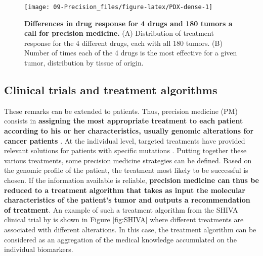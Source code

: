 \documentclass[a4paper,12pt,twoside,onecolumn,openright,final,oldfontcommands]{memoir}
\begin{document}
\begin{figure}

{\centering \texttt{[image: 09-Precision\_files/figure-latex/PDX-dense-1]} 

}

\caption[Differences in drug response for 4 drugs and 180 tumors a call for precision medicine]{\textbf{Differences in drug response for 4 drugs
and 180 tumors a call for precision medicine.} (A) Distribution of
treatment response for the 4 different drugs, each with all 180 tumors.
(B) Number of times each of the 4 drugs is the most effective for a
given tumor, distribution by tissue of origin.}\label{fig:PDX-dense}
\end{figure}







\subsection{Clinical trials and treatment
algorithms}\label{clinical-trials-and-treatment-algorithms}

These remarks can be extended to patients. Thus, precision medicine (PM)
consists in \textbf{assigning the most appropriate treatment to each
patient according to his or her characteristics, usually genomic
alterations for cancer patients}
\citep{friedman2015precision, de2015pragmatic}. At the individual level,
targeted treatments have provided relevant solutions for patients with
specific mutations \citep{abou2003overview}. Putting together these
various treatments, some precision medicine strategies can be defined.
Based on the genomic profile of the patient, the treatment most likely
to be successful is chosen. If the information available is reliable,
\textbf{precision medicine can thus be reduced to a treatment algorithm
that takes as input the molecular characteristics of the patient's tumor
and outputs a recommendation of treatment}. An example of such a
treatment algorithm from the SHIVA clinical trial by
\citet{le2015molecularly} is shown in Figure \ref{fig:SHIVA} where
different treatments are associated with different alterations. In this
case, the treatment algorithm can be considered as an aggregation of the
medical knowledge accumulated on the individual biomarkers.
\end{document}
